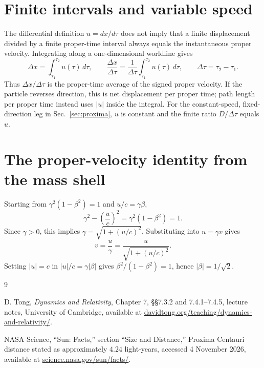 \documentclass[12pt]{article}
\begin{document}
\section{Finite intervals and variable speed}
\label{app:finite-intervals}

The differential definition $u=dx/d\tau$ does not imply that a finite displacement divided by a finite proper-time interval always equals the instantaneous proper velocity. Integrating along a one-dimensional worldline gives
\begin{equation}
  \Delta x=\int_{\tau_1}^{\tau_2}u(\tau)\,d\tau,
  \qquad
  \frac{\Delta x}{\Delta\tau}
  =\frac{1}{\Delta\tau}\int_{\tau_1}^{\tau_2}u(\tau)\,d\tau,
  \qquad \Delta\tau=\tau_2-\tau_1.
  \label{eq:proper-time-average}
\end{equation}
Thus $\Delta x/\Delta\tau$ is the proper-time average of the signed proper velocity. If the particle reverses direction, this is net displacement per proper time; path length per proper time instead uses $|u|$ inside the integral. For the constant-speed, fixed-direction leg in Sec.~\ref{sec:proxima}, $u$ is constant and the finite ratio $D/\Delta\tau$ equals $u$.

\section{The proper-velocity identity from the mass shell}
\label{app:algebra}

Starting from $\gamma^2(1-\beta^2)=1$ and $u/c=\gamma\beta$,
\begin{equation}
  \gamma^2-\left(\frac{u}{c}\right)^2
  =\gamma^2(1-\beta^2)=1.
  \label{eq:app-hyperbola}
\end{equation}
Since $\gamma>0$, this implies $\gamma=\sqrt{1+(u/c)^2}$. Substituting into $u=\gamma v$ gives
\begin{equation}
  v=\frac{u}{\gamma}
   =\frac{u}{\sqrt{1+(u/c)^2}}.
  \label{eq:app-inverse}
\end{equation}
Setting $|u|=c$ in $|u|/c=\gamma|\beta|$ gives $\beta^2/(1-\beta^2)=1$, hence $|\beta|=1/\sqrt2$.

\clearpage

\begin{thebibliography}{9}
\small
{}
\raggedright
{}

D. Tong,
\emph{Dynamics and Relativity},
Chapter 7, §§7.3.2 and 7.4.1--7.4.5,
lecture notes, University of Cambridge,
available at \href{https://davidtong.org/teaching/dynamics-and-relativity/}{davidtong.org/teaching/dynamics-and-relativity/}.

NASA Science,
``Sun: Facts,'' section ``Size and Distance,''
Proxima Centauri distance stated as approximately $4.24$ light-years,
accessed 4 November 2026,
available at \href{https://science.nasa.gov/sun/facts/}{science.nasa.gov/sun/facts/}.

\end{thebibliography}
\end{document}
